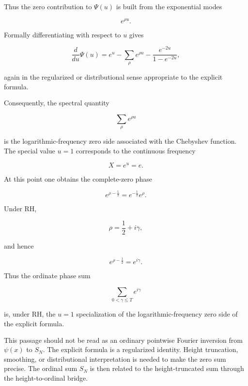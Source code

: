 \documentclass[11pt]{amsart}
\numberwithin{equation}{section}
\theoremstyle{plain}
\theoremstyle{definition}
\theoremstyle{remark}
\begin{document}
Thus the zero contribution to \(\Psi(u)\) is built from the exponential
modes

\begin{equation}
e^{\rho u}.
\end{equation}

Formally differentiating with respect to \(u\) gives

\begin{equation}
\frac{d}{du}\Psi(u)
=
e^u
-
\sum_\rho e^{\rho u}
-
\frac{e^{-2u}}{1-e^{-2u}},
\label{eq:chebyshev_log_frequency_formal_derivative}
\end{equation}

again in the regularized or distributional sense appropriate to the
explicit formula.

Consequently, the spectral quantity

\begin{equation}
\sum_\rho e^{\rho u}
\end{equation}

is the logarithmic-frequency zero side associated with the Chebyshev
function. The special value \(u=1\) corresponds to the continuous
frequency

\begin{equation}
X=e^u=e.
\end{equation}

At this point one obtains the complete-zero phase

\begin{equation}
e^{\rho-\frac12}
=
e^{-\frac12}e^{\rho}.
\end{equation}

Under RH,

\begin{equation}
\rho=\frac12+i\gamma,
\end{equation}

and hence

\begin{equation}
e^{\rho-\frac12}=e^{i\gamma}.
\end{equation}

Thus the ordinate phase sum

\begin{equation}
\sum_{0<\gamma\le T}e^{i\gamma}
\end{equation}

is, under RH, the \(u=1\) specialization of the
logarithmic-frequency zero side of the explicit formula.

This passage should not be read as an ordinary pointwise Fourier
inversion from \(\psi(x)\) to \(S_N\). The explicit formula is a
regularized identity. Height truncation, smoothing, or distributional
interpretation is needed to make the zero sum precise. The ordinal sum
\(S_N\) is then related to the height-truncated sum through the
height-to-ordinal bridge.
\end{document}
